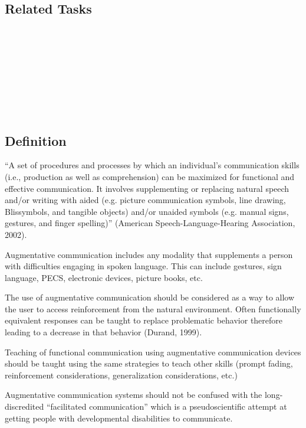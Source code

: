 \subsection{Related Tasks}
\fourbThree{}\\ 
\fourdFour{}\\
\fourdFive{}\\
\fourdEleven{}\\
\fourjSix{}\\
\fourjEleven{}\\
\fourFKFourtyFour{}\\
%
\clearpage \section{\fourfEight{}}
\subsection{Definition}
``A set of procedures and processes by which an individual's communication skills (i.e., production as well as comprehension) can be maximized for functional and effective communication. It involves supplementing or replacing natural speech and/or writing with aided (e.g. picture communication symbols, line drawing, Blissymbols, and tangible objects) and/or unaided symbols (e.g. manual signs, gestures, and finger spelling)'' (American Speech-Language-Hearing Association, 2002).

Augmentative communication includes any modality that supplements a person with difficulties engaging in spoken language. This can include gestures, sign language, PECS, electronic devices, picture books, etc.

The use of augmentative communication should be considered as a way to allow the user to access reinforcement from the natural environment. Often functionally equivalent responses can be taught to replace problematic behavior therefore leading to a decrease in that behavior (Durand, 1999).

Teaching of functional communication using augmentative communication devices should be taught using the same strategies to teach other skills (prompt fading, reinforcement considerations, generalization considerations, etc.)

Augmentative communication systems should not be confused with the long-discredited ``facilitated communication'' which is a pseudoscientific attempt at getting people with developmental disabilities to communicate.

